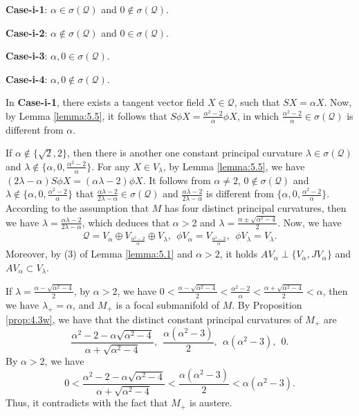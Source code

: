 \documentclass[reqno]{amsart}%
\theoremstyle{definition}
\numberwithin{equation}{section}
\begin{document}
{\bf Case-i-1}: $\alpha\in\sigma(\mathcal{Q})$ and $0\notin\sigma(\mathcal{Q})$.

{\bf Case-i-2}: $\alpha\notin\sigma(\mathcal{Q})$ and $0\in\sigma(\mathcal{Q})$.

{\bf Case-i-3}: $\alpha,0\in\sigma(\mathcal{Q})$.

{\bf Case-i-4}: $\alpha,0\notin\sigma(\mathcal{Q})$.

In {\bf Case-i-1}, there exists a tangent vector field $X\in\mathcal{Q}$, such that
$SX=\alpha X$. Now, by Lemma \ref{lemma:5.5}, it follows that $S\phi X=\tfrac{\alpha^2-2}{\alpha}\phi X$,
in which $\tfrac{\alpha^2-2}{\alpha}\in\sigma(\mathcal{Q})$ is different from $\alpha$.

If $\alpha\notin\{\sqrt{2},2\}$, then there is another one constant principal curvature $\lambda\in\sigma(\mathcal{Q})$ and
$\lambda\notin\{\alpha,0,\tfrac{\alpha^2-2}{\alpha}\}$. For any $X\in V_\lambda$, by Lemma \ref{lemma:5.5}, we have $(2\lambda-\alpha)S\phi X=(\alpha\lambda-2)\phi X$. It follows from $\alpha\neq2$, $0\notin\sigma(\mathcal{Q})$ and $\lambda\notin\{\alpha,0,\tfrac{\alpha^2-2}{\alpha}\}$ that $\frac{\alpha\lambda-2}{2\lambda-\alpha}\in\sigma(\mathcal{Q})$ and
$\frac{\alpha\lambda-2}{2\lambda-\alpha}$
is different from $\{\alpha,0,\tfrac{\alpha^2-2}{\alpha}\}$. According to the assumption that
$M$ has four distinct principal curvatures, then we have $\lambda=\frac{\alpha\lambda-2}{2\lambda-\alpha}$, which deduces that
$\alpha>2$ and $\lambda=\frac{\alpha\pm\sqrt{\alpha^2-4}}{2}$. Now, we have
$$
\begin{aligned}
\mathcal{Q}=V_\alpha\oplus V_{\tfrac{\alpha^2-2}{\alpha}}\oplus V_{\lambda}, \ \ \phi V_\alpha= V_{\tfrac{\alpha^2-2}{\alpha}},\ \ \phi V_\lambda=V_\lambda.
\end{aligned}
$$
Moreover, by (3) of Lemma \ref{lemma:5.1} and $\alpha>2$, it holds $AV_{\alpha}\perp \{V_{\alpha},JV_{\alpha}\}$ and $AV_{\alpha}\subset V_\lambda$.

If $\lambda=\frac{\alpha-\sqrt{\alpha^2-4}}{2}$,
by $\alpha>2$, we have $0<\frac{\alpha-\sqrt{\alpha^2-4}}{2}<\tfrac{\alpha^2-2}{\alpha}<\frac{\alpha+\sqrt{\alpha^2-4}}{2}
<\alpha$, then we have $\lambda_+=\alpha$, and $M_+$ is a focal submanifold of $M$. By Proposition \ref{prop:4.3w}, we have that the distinct constant principal curvatures of $M_+$ are
$$
\frac{\alpha^2-2-\alpha\sqrt{\alpha^2-4}}{\alpha+\sqrt{\alpha^2-4}}, \ \
\frac{\alpha(\alpha^2-3)}{2}, \ \ \alpha(\alpha^2-3),\ \ 0.
$$
By $\alpha>2$, we have
$$
0<\frac{\alpha^2-2-\alpha\sqrt{\alpha^2-4}}{\alpha+\sqrt{\alpha^2-4}}
<\frac{\alpha(\alpha^2-3)}{2}<\alpha(\alpha^2-3).
$$
Thus, it contradicts with the fact that $M_+$ is austere.
\end{document}
